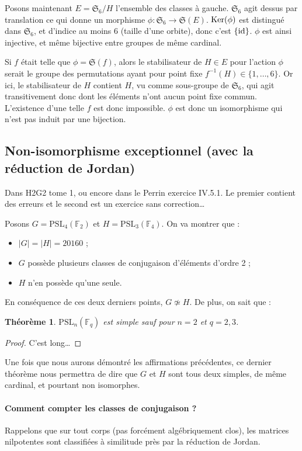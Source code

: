 \documentclass[a4paper, 11pt]{article}
\def\F{\mathbb{F}}
\def\Sigmap{\mathfrak{S}}
\def\Ker{\textnormal{Ker}}
\def\PSL{\mathrm{PSL}}
\newtheorem*{theorem}{Théorème}
\begin{document}
Posons maintenant $E = \Sigmap_6/H$ l'ensemble des classes à gauche. $\Sigmap_6$
agit dessus par translation ce qui donne un morphisme $\phi : \Sigmap_6 \to
\Sigmap(E)$. $\Ker(\phi)$ est distingué dans $\Sigmap_6$, et d'indice au moins 6
(taille d'une orbite), donc c'est $\{\textnormal{id}\}$. $\phi$ est ainsi
injective, et même bijective entre groupes de même cardinal.

Si $f$ était telle que $\phi = \Sigmap(f)$, alors le stabilisateur de $H \in E$
pour l'action $\phi$ serait le groupe des permutations ayant pour point fixe
$f^{-1}(H) \in \{1,\ldots,6\}$. Or ici, le stabilisateur de $H$ contient $H$, vu
comme sous-groupe de $\Sigmap_6$, qui agit transitivement donc dont les éléments
n'ont aucun point fixe commun. L'existence d'une telle $f$ est donc impossible.
$\phi$ est donc un isomorphisme qui n'est pas induit par une bijection.

\newpage

\subsection{Non-isomorphisme exceptionnel (avec la réduction de Jordan)}

Dans H2G2 tome 1, ou encore dans le Perrin exercice IV.5.1. Le premier contient
des erreurs et le second est un exercice sans correction…

Posons $G = \PSL_4(\F_2)$ et $H = \PSL_3(\F_4)$. On va montrer que :
\begin{itemize}
\item $|G| = |H| = 20160$ ;
\item $G$ possède plusieurs classes de conjugaison d'éléments d'ordre 2 ;
\item $H$ n'en possède qu'une seule.
\end{itemize}
En conséquence de ces deux derniers points, $G \not\simeq H$. De plus, on sait
que :
\begin{theorem}
  $\PSL_n(\F_q)$ est simple sauf pour $n = 2$ et $q = 2,3$.
\end{theorem}
\begin{proof}
  C'est long…
\end{proof}
Une fois que nous aurons démontré les affirmations précédentes, ce dernier
théorème nous permettra de dire que $G$ et $H$ sont tous deux simples, de même
cardinal, et pourtant non isomorphes.

\paragraph{Comment compter les classes de conjugaison ?} Rappelons que sur tout
corps (pas forcément algébriquement clos), les matrices nilpotentes sont
classifiées à similitude près par la réduction de Jordan.
\end{document}
